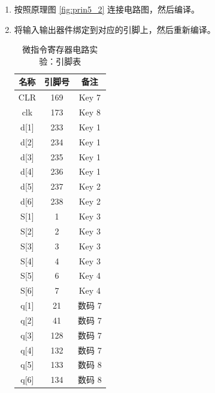 \begin{enumerate}
    \item 按照原理图 \ref{fig:prin5_2} 连接电路图，然后编译。
    \item 将输入输出器件绑定到对应的引脚上，然后重新编译。
    
    \begin{table}[H]
        \centering
        \begin{tabular}{|c|c|c|}
            \hline
            名称 & 引脚号 & 备注 \\
            \hline
            CLR & 169 & Key 7 \\
            \hline
            clk & 173 & Key 8 \\
            \hline
            d[1] & 233 & Key 1 \\
            \hline
            d[2] & 234 & Key 1 \\
            \hline
            d[3] & 235 & Key 1 \\
            \hline
            d[4] & 236 & Key 1 \\
            \hline
            d[5] & 237 & Key 2 \\
            \hline
            d[6] & 238 & Key 2 \\
            \hline
            S[1] & 1 & Key 3 \\
            \hline
            S[2] & 2 & Key 3 \\
            \hline
            S[3] & 3 & Key 3 \\
            \hline
            S[4] & 4 & Key 3 \\
            \hline
            S[5] & 6 & Key 4 \\
            \hline
            S[6] & 7 & Key 4 \\
            \hline
            q[1] & 21 & 数码 7 \\
            \hline
            q[2] & 41 & 数码 7 \\
            \hline
            q[3] & 128 & 数码 7 \\
            \hline
            q[4] & 132 & 数码 7 \\
            \hline
            q[5] & 133 & 数码 8 \\
            \hline
            q[6] & 134 & 数码 8 \\
            \hline
        \end{tabular}
        \caption{微指令寄存器电路实验：引脚表}
        \label{tab:pin5_2}
    \end{table}
    

\end{enumerate}
